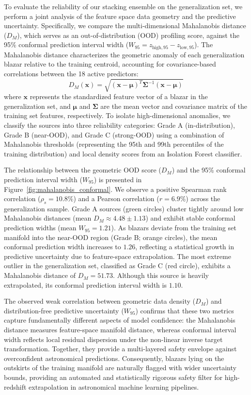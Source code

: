 \documentclass[twocolumn,linenumbers,floatfix]{aastex701}
\begin{document}
To evaluate the reliability of our stacking ensemble on the generalization set, we perform a joint analysis of the feature space data geometry and the predictive uncertainty. Specifically, we compare the multi-dimensional Mahalanobis distance ($D_M$), which serves as an out-of-distribution (OOD) profiling score, against the 95\% conformal prediction interval width ($W_{95} = z_{\text{high}, 95} - z_{\text{low}, 95}$). The Mahalanobis distance characterizes the geometric anomaly of each generalization blazar relative to the training centroid, accounting for covariance-based correlations between the 18 active predictors:
\begin{equation}
\label{eq:mahalanobis_dist}
D_M(\mathbf{x}) = \sqrt{(\mathbf{x} - \boldsymbol{\mu})^T \mathbf{\Sigma}^{-1} (\mathbf{x} - \boldsymbol{\mu})}
\end{equation}
where $\mathbf{x}$ represents the standardized feature vector of a blazar in the generalization set, and $\boldsymbol{\mu}$ and $\mathbf{\Sigma}$ are the mean vector and covariance matrix of the training set features, respectively. To isolate high-dimensional anomalies, we classify the sources into three reliability categories: Grade A (in-distribution), Grade B (near-OOD), and Grade C (strong-OOD) using a combination of Mahalanobis thresholds (representing the 95th and 99th percentiles of the training distribution) and local density scores from an Isolation Forest classifier.

The relationship between the geometric OOD score ($D_M$) and the 95\% conformal prediction interval width ($W_{95}$) is presented in Figure~\ref{fig:mahalanobis_conformal}. We observe a positive Spearman rank correlation ($\rho_s = 10.8\%$) and a Pearson correlation ($r = 6.9\%$) across the generalization sample. Grade A sources (green circles) cluster tightly around low Mahalanobis distances (mean $D_M \approx 4.48 \pm 1.13$) and exhibit stable conformal prediction widths (mean $W_{95} = 1.21$). As blazars deviate from the training set manifold into the near-OOD region (Grade B; orange circles), the mean conformal prediction width increases to $1.26$, reflecting a statistical growth in predictive uncertainty due to feature-space extrapolation. The most extreme outlier in the generalization set, classified as Grade C (red circle), exhibits a Mahalanobis distance of $D_M = 51.73$. Although this source is heavily extrapolated, its conformal prediction interval width is $1.10$. 

The observed weak correlation between geometric data density ($D_M$) and distribution-free predictive uncertainty ($W_{95}$) confirms that these two metrics capture fundamentally different aspects of model confidence: the Mahalanobis distance measures feature-space manifold distance, whereas conformal interval width reflects local residual dispersion under the non-linear inverse target transformation. Together, they provide a multi-layered safety envelope against overconfident astronomical predictions. Consequently, blazars lying on the outskirts of the training manifold are naturally flagged with wider uncertainty bounds, providing an automated and statistically rigorous safety filter for high-redshift extrapolation in astronomical machine learning pipelines.
\end{document}
